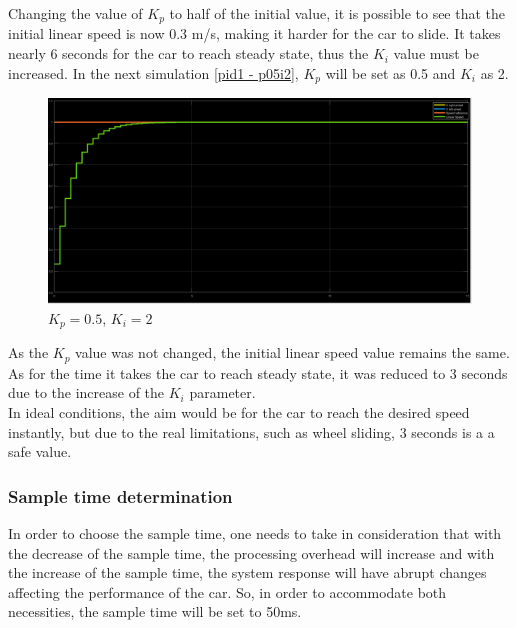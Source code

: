 Changing the value of $K_p$ to half of the initial value, it is possible to see that the initial linear speed is now 0.3 m/s, making it harder for the car to slide. It takes nearly 6 seconds for the car to reach steady state, thus the $K_i$ value must be increased.
In the next simulation \ref{pid1 - p05i2}, $K_p$ will be set as 0.5 and $K_i$ as 2.
\begin{figure}[!h]
\centering
\includegraphics[width=1.0\textwidth]{./img/pid052.png}
\caption {\label{fig:pid1 - p05i2}$K_p=0.5$, $K_i=2$}
\end{figure}
As the $K_p$ value was not changed, the initial linear speed value remains the same. As for the time it takes the car to reach steady state, it was reduced to 3 seconds due to the increase of the $K_i$ parameter.\\
In ideal conditions, the aim would be for the car to reach the desired speed
instantly, but due to the real limitations, such as wheel sliding, 3 seconds is
a a safe value.
%
\subsubsection{Sample time determination}
In order to choose the sample time, one needs to take in consideration that with the decrease of the sample time, the processing overhead will increase and with the increase of the sample time, the system response will have abrupt changes affecting the performance of the car. So, in order to accommodate both necessities, the sample time will be set to 50ms.
